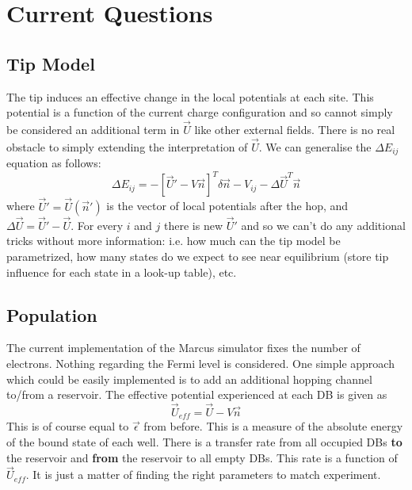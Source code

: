 \documentclass[11pt]{article}
\begin{document}
\section{Current Questions}

\subsection{Tip Model}

The tip induces an effective change in the local potentials at each site. This potential is a function of the current charge configuration and so cannot simply be considered an additional term in $\vec{U}$ like other external fields. There is no real obstacle to simply extending the interpretation of $\vec{U}$. We can generalise the $\Delta E_{ij}$ equation as follows:
\begin{equation}
\Delta E_{ij} = -[\vec{U}' -V\vec{n}]^T \delta \vec{n} - V_{ij} - \Delta \vec{U}^T \vec{n}
\end{equation}
where $\vec{U}' = \vec{U}(\vec{n}')$ is the vector of local potentials after the hop, and $\Delta \vec{U} = \vec{U}' - \vec{U}$. For every $i$ and $j$ there is new $\vec{U}'$ and so we can't do any additional tricks without more information: i.e. how much can the tip model be parametrized, how many states do we expect to see near equilibrium (store tip influence for each state in a look-up table), etc.

\subsection{Population}

The current implementation of the Marcus simulator fixes the number of electrons. Nothing regarding the Fermi level is considered. One simple approach which could be easily implemented is to add an additional hopping channel to/from a reservoir. The effective potential experienced at each DB is given as
\begin{equation}
\vec{U}_{eff} = \vec{U} - V \vec{n}
\end{equation}
This is of course equal to $\vec{\epsilon}$ from before. This is a measure of the absolute energy of the bound state of each well. There is a transfer rate from all occupied DBs \textbf{to} the reservoir and \textbf{from} the reservoir to all empty DBs. This rate is a function of $\vec{U}_{eff}$. It is just a matter of finding the right parameters to match experiment.
\end{document}
